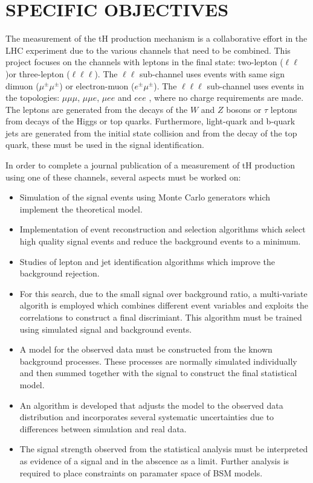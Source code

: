 \documentclass[final,3p]{CSP}
\begin{document}
\section{SPECIFIC OBJECTIVES}

The measurement of the tH production mechanism is a collaborative effort in the LHC experiment due to the various channels that need to be combined.
This project focuses on the channels with leptons in the final state: two-lepton ($\ell\ell$)or three-lepton ($\ell\ell\ell$).
The $\ell\ell$ sub-channel uses events with same sign dimuon ($\mu^\pm\mu^\pm$) or electron-muon ($e^\pm\mu^\pm$).
The $\ell\ell\ell$ sub-channel uses events in the topologies: $\mu\mu\mu$, $\mu\mu e$, $\mu e e$ and $e e e$ , where no charge requirements are made.
The leptons are generated from the decays of the $W$ and $Z$ bosons or $\tau$ leptons from decays of the Higgs or top quarks.
Furthermore, light-quark and b-quark jets are generated from the initial state collision and from the decay of the top quark, these must be used in the signal identification.

In order to complete a journal publication of a  measurement of tH production using one of these channels, several aspects  must be worked on:
\begin{itemize}
\item Simulation of the signal events using Monte Carlo generators which implement the theoretical model.
\item Implementation of event reconstruction and selection algorithms which select high quality signal events and reduce the background events to a minimum.
\item Studies of lepton and jet identification algorithms which improve the background rejection.
\item For this search, due to the small signal over background ratio, a multi-variate algorith is employed which combines different event variables and exploits the correlations to construct a final discrimiant. This algorithm must be trained using simulated signal and background events.
\item A model for the observed data must be constructed from the known background processes. These processes are normally simulated individually and then summed together with the signal to construct the final statistical model.
\item An algorithm is developed that adjusts the model to the observed data distribution and incorporates several systematic uncertainties due to differences between simulation and real data.
\item The signal strength observed from the statistical analysis must be interpreted as evidence of a signal and in the abscence as a limit. Further analysis is required to place constraints on paramater space of BSM models.
\end{itemize}
\end{document}
